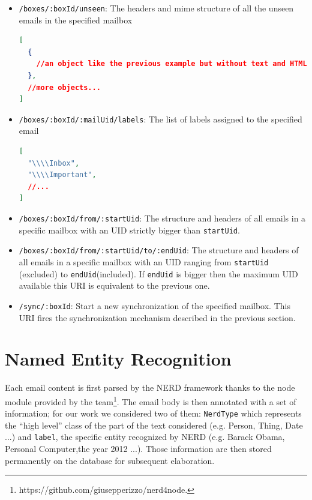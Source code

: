 \documentclass[a4paper,12pt]{report}
\begin{document}
\begin{itemize}
\begin{lstlisting}[language=JSON]
  ]
}
\end{lstlisting}
\item \texttt{/boxes/:boxId/unseen}: The headers and mime structure of  all the unseen emails in the specified mailbox
\begin{lstlisting}[language=JSON]
[
  {
    //an object like the previous example but without text and HTML 
  },
  //more objects...
]
\end{lstlisting}
\item \texttt{/boxes/:boxId/:mailUid/labels}: The list of labels assigned to the specified email
\begin{lstlisting}[language=JSON]
[
  "\\\\Inbox",
  "\\\\Important",
  //...
]
\end{lstlisting}
\item \texttt{/boxes/:boxId/from/:startUid}: The structure and headers of all emails in a specific mailbox with an UID strictly bigger than \texttt{startUid}.
\item \texttt{/boxes/:boxId/from/:startUid/to/:endUid}: The structure and headers of all emails in a specific mailbox with an UID ranging from \texttt{startUid} (excluded) to \texttt{endUid}(included). If \texttt{endUid} is bigger then the maximum UID available this URI is equivalent to the previous one.
\item \texttt{/sync/:boxId}: Start a new synchronization of the specified mailbox. This URI fires the synchronization mechanism described in the previous section.
\end{itemize}

\section{Named Entity Recognition}
Each email content is first parsed by the NERD framework thanks to the node module provided by the team\footnote{https://github.com/giusepperizzo/nerd4node.}. The email body is then annotated with a set of information; for our work we considered two of them: \texttt{NerdType} which represents the ``high level'' class of the part of the text considered (e.g. Person, Thing, Date ...) and \texttt{label}, the specific entity recognized by NERD (e.g. Barack Obama, Personal Computer,the year 2012 ...). 
Those information are then stored permanently on the database for subsequent elaboration.
\end{document}

